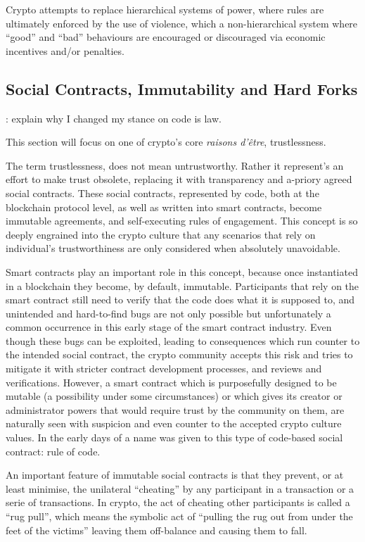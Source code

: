 Crypto attempts to replace hierarchical systems of power, where rules are ultimately enforced by the use of violence, which a non-hierarchical system where ``good'' and ``bad'' behaviours are encouraged or discouraged via economic incentives and/or penalties.

\subsection{Social Contracts, Immutability and Hard Forks}


\todo : explain why I changed my stance on code is law.

This section will focus on one of crypto's core \emph{raisons d'être}, trustlessness.

The term trustlessness, does not mean untrustworthy. Rather it represent's an effort to make trust obsolete, replacing it with transparency and a-priory agreed social contracts. These social contracts, represented by code, both at the blockchain protocol level, as well as written into smart contracts, become immutable agreements, and self-executing rules of engagement. This concept is so deeply engrained into the crypto culture that any scenarios that rely on individual's trustworthiness are only considered when absolutely unavoidable.

Smart contracts play an important role in this concept, because once instantiated in a blockchain they become, by default, immutable. Participants that rely on the smart contract still need to verify that the code does what it is supposed to, and unintended and hard-to-find bugs are not only possible but unfortunately a common occurrence in this early stage of the smart contract industry. Even though these bugs can be exploited, leading to consequences which run counter to the intended social contract, the crypto community accepts this risk and tries to mitigate it with stricter contract development processes, and reviews and verifications. However, a smart contract which is purposefully designed to be mutable (a possibility under some circumstances) or which gives its creator or administrator powers that would require trust by the community on them, are naturally seen with suspicion and even counter to the accepted crypto culture values. In the early days of  a name was given to this type of code-based social contract: rule of code.

An important feature of immutable social contracts is that they prevent, or at least minimise, the unilateral ``cheating'' by any participant in a transaction or a serie of transactions. In crypto, the act of cheating other participants is called a ``rug pull'', which means the symbolic act of ``pulling the rug out from under the feet of the victims'' leaving them off-balance and causing them to fall.

